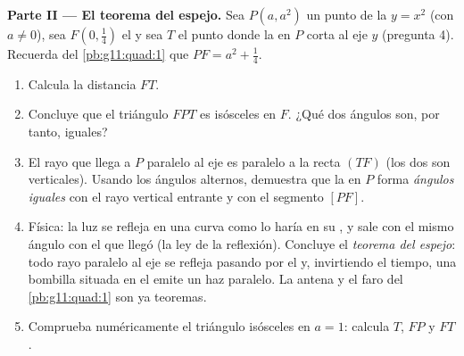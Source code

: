 \begin{problem}
\medskip
\noindent\textbf{Parte II --- El teorema del espejo.}
Sea $P(a, a^2)$ un punto de la  $y = x^2$ (con $a \neq 0$), sea
$F\left(0, \frac14\right)$ el  y sea $T$ el punto donde la  en
$P$ corta al eje $y$ (pregunta 4). Recuerda del \cref{pb:g11:quad:1} que
$PF = a^2 + \frac14$.
\begin{enumerate}[resume]
  \item Calcula la distancia $FT$.
  \item Concluye que el triángulo $FPT$ es isósceles en $F$. ¿Qué dos
        ángulos son, por tanto, iguales?
  \item El rayo que llega a $P$ paralelo al eje es paralelo a la recta
        $(TF)$ (los dos son verticales). Usando los ángulos alternos,
        demuestra que la  en $P$ forma \emph{ángulos iguales} con
        el rayo vertical entrante y con el segmento $[PF]$.
  \item Física: la luz se refleja en una curva como lo haría en su
        , y sale con el mismo ángulo con el que llegó (la ley de
        la reflexión). Concluye el \emph{teorema del espejo}: todo rayo
        paralelo al eje se refleja pasando por el  y, invirtiendo el
        tiempo, una bombilla situada en el  emite un haz paralelo. La
        antena y el faro del \cref{pb:g11:quad:1} son ya teoremas.
  \item Comprueba numéricamente el triángulo isósceles en $a = 1$:
        calcula $T$, $FP$ y $FT$.
\end{enumerate}


\end{problem}
